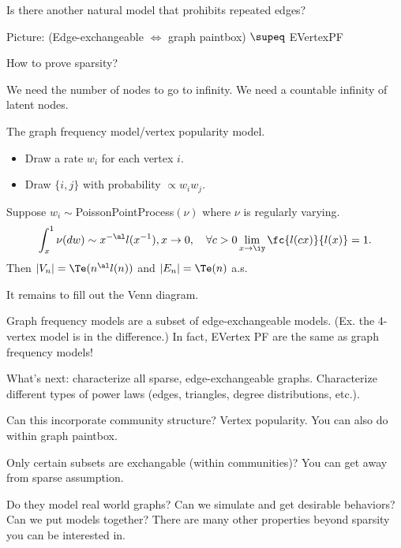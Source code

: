 Is there another natural model that prohibits repeated edges? %


Picture: (Edge-exchangeable $\iff$ graph paintbox) $\supeq$ EVertexPF

How to prove sparsity?

We need the number of nodes to go to infinity. We need a countable infinity of latent nodes. 

The graph frequency model/vertex popularity model.
\begin{itemize}
\item
Draw a rate $w_i$ for each vertex $i$.
\item
Draw $\{i,j\}$ with probability $\propto w_iw_j$.
\end{itemize}
Suppose $w_i \sim$PoissonPointProcess$(\nu)$ where $\nu$ is regularly varying. 
$$
\int_x^1 \nu(dw) \sim x^{-\al} l(x^{-1}),x\to 0, \quad \forall c>0\lim_{x\to \iy}\fc{l(cx)}{l(x)}=1.
$$
Then $|V_n|=\Te(n^\al l(n))$ and $|E_n|=\Te(n)$ a.s. 

It remains to fill out the Venn diagram.

Graph frequency models are a subset of edge-exchangeable models. (Ex. the 4-vertex model is in the difference.)
In fact, EVertex PF are the same as graph frequency models!

What's next: characterize all sparse, edge-exchangeable graphs. Characterize different types of power laws (edges, triangles, degree distributions, etc.). 



Can this incorporate community structure? Vertex popularity. You can also do within graph paintbox.

Only certain subsets are exchangable (within communities)? You can get away from sparse assumption.

Do they model real world graphs? Can we simulate and get desirable behaviors? Can we put models together? %
There are many other properties beyond sparsity you can be interested in.



